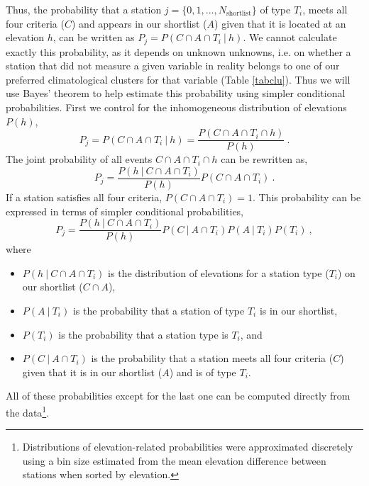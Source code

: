 \documentclass[12pt]{iopart}
\begin{document}
Thus, the probability that a station $j=\{0,1,...,N_\mathrm{shortlist}\}$ of type $T_i$, meets all four criteria ($C$) and appears in our shortlist ($A$) given that it is located at an elevation $h$, can be written as $P_j=P(C\cap A\cap T_i\ |\ h)$. We cannot  calculate exactly this probability, as it depends on unknown unknowns, i.e. on whether a station that did not measure a given variable in reality belongs to one of our preferred climatological clusters for that variable (Table \ref{tabclu}). Thus we will use Bayes' theorem to help estimate this probability using simpler conditional probabilities. First we control for the inhomogeneous distribution of elevations $P(h)$,
\begin{equation}
P_j=P(C\cap A\cap T_i\ |\ h)=\frac{P(C\cap A\cap T_i\cap h)}{P(h)}\ .
\end{equation}
The joint probability of all events $C\cap A\cap T_i\cap h$ can be rewritten as,
\begin{equation}
P_j=\frac{P(h\ |\ C\cap A\cap T_i)}{P(h)}P(C\cap A\cap T_i)\ .
\end{equation}
If a station satisfies all four criteria, $P(C\cap A\cap T_i)=1$. This probability can be expressed in terms of simpler conditional probabilities,
\begin{equation}\label{peejay}
P_j=\frac{P(h\ |\ C\cap A\cap T_i)}{P(h)}P(C\ |\ A\cap T_i)P(A\ |\ T_i)P(T_i)\ ,
\end{equation}
where 
\begin{itemize}
\item $P(h\ |\ C\cap A\cap T_i)$ is the distribution of elevations for a station type ($T_i$) on our shortlist ($C\cap A$), 
\item $P(A\ |\ T_i)$ is the probability that a station of type $T_i$ is in our shortlist, 
\item $P(T_i)$ is the probability that a station type is $T_i$, and 
\item $P(C\ |\ A\cap T_i)$ is the probability that a station meets all four criteria ($C$) given that it is in our shortlist ($A$) and is of type $T_i$. 
\end{itemize}
All of these probabilities except for the last one can be computed directly from the data\footnote{Distributions of elevation-related probabilities were approximated discretely using a bin size estimated from the mean elevation difference between stations when sorted by elevation. }.\\
\end{document}
